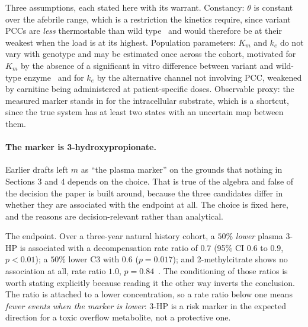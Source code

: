Three assumptions, each stated here with its warrant.
Constancy: $\theta$ is constant over the afebrile range, which is a restriction the
kinetics require, since variant PCCs are \emph{less} thermostable than wild
type~\cite{pcc_variants_kinetics} %
and would therefore be at their weakest when the load is at its highest.
Population parameters: $K_m$ and $k_e$ do not vary with genotype and may be
estimated once across the cohort, motivated for $K_m$ by the absence of a significant in
vitro difference between variant and wild-type enzyme~\cite{pcc_variants_kinetics} %
and for $k_e$ by the alternative channel not involving PCC, weakened by carnitine being
administered at patient-specific doses. Observable proxy: the measured marker
stands in for the intracellular substrate, which is a shortcut, since the true system has at
least two states with an uncertain map between them.



\paragraph{The marker is 3-hydroxypropionate.}
\label{sec:marker_orig}
Earlier drafts left $m$ as ``the plasma marker'' on the grounds that nothing in Sections 3
and 4 depends on the choice. That is true of the algebra and false of the decision the paper
is built around, because the three candidates differ in whether they are associated with the
endpoint at all. The choice is fixed here, and the reasons are decision-relevant rather than
analytical.

The endpoint. Over a three-year natural history cohort, a $50\%$ \emph{lower}
plasma 3-HP is associated with a decompensation rate ratio of $0.7$ (95\% CI $0.6$ to $0.9$,
$p<0.01$); a $50\%$ lower C3 with $0.6$ ($p=0.017$); and 2-methylcitrate shows no
association at all, rate ratio $1.0$, $p=0.84$~\cite{natural_history}. %
The conditioning of those ratios is worth stating explicitly because reading it the other
way inverts the conclusion. The ratio is attached to a lower concentration, so a rate ratio
below one means \emph{fewer events when the marker is lower}: 3-HP is a risk marker in the
expected direction for a toxic overflow metabolite, not a protective one.

